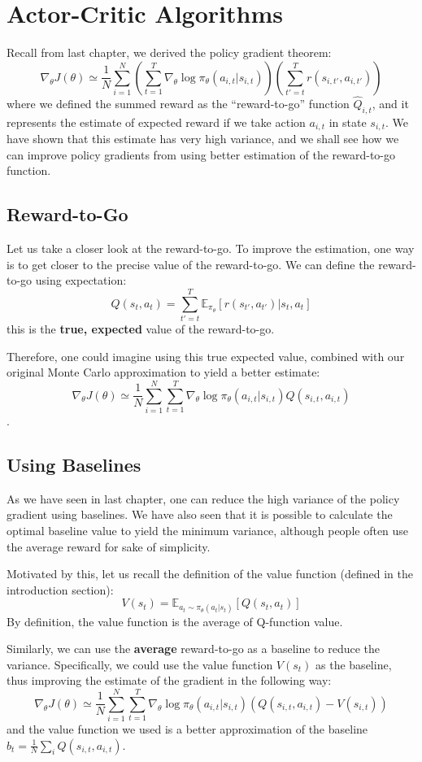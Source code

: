 \chapter{Actor-Critic Algorithms}
Recall from last chapter, we derived the policy gradient theorem:
$$\nabla_\theta J(\theta) \simeq \frac{1}{N}\sum_{i=1}^N\left(\sum_{t=1}^T\nabla_\theta \log\pi_\theta(a_{i,t}|s_{i,t})\right)\left(\sum_{t'=t}^T r(s_{i,t'},a_{i,t'})\right)$$
where we defined the summed reward as the ``reward-to-go'' function $\hat{Q}_{i,t}$, and it represents the estimate of expected reward if we take action $a_{i,t}$ in state $s_{i,t}$. We have shown that this estimate has very high variance, and we shall see how we can improve policy gradients from using better estimation of the reward-to-go function.

\section{Reward-to-Go}
Let us take a closer look at the reward-to-go. To improve the estimation, one way is to get closer to the precise value of the reward-to-go. We can define the reward-to-go using expectation:
$$Q(s_t,a_t) = \sum_{t'=t}^T \mathbb{E}_{\pi_\theta}\left[r(s_{t'},a_{t'})|s_t,a_t\right]$$
this is the \textbf{true, expected} value of the reward-to-go.

Therefore, one could imagine using this true expected value, combined with our original Monte Carlo approximation to yield a better estimate:
$$\nabla_\theta J(\theta) \simeq \frac{1}{N}\sum_{i=1}^N\sum_{t=1}^T\nabla_{\theta}\log \pi_\theta (a_{i,t}|s_{i,t})Q(s_{i,t},a_{i,t})$$.

\section{Using Baselines}
As we have seen in last chapter, one can reduce the high variance of the policy gradient using baselines. We have also seen that it is possible to calculate the optimal baseline value to yield the minimum variance, although people often use the average reward for sake of simplicity.

Motivated by this, let us recall the definition of the value function (defined in the introduction section):
$$V(s_t) = \mathbb{E}_{a_t\sim \pi_\theta(a_t|s_t)}\left[Q(s_t,a_t)\right]$$
By definition, the value function is the average of Q-function value.

Similarly, we can use the \textbf{average} reward-to-go as a baseline to reduce the variance. Specifically, we could use the value function $V(s_t)$ as the baseline, thus improving the estimate of the gradient in the following way:
$$\nabla_\theta J(\theta) \simeq \frac{1}{N}\sum_{i=1}^N\sum_{t=1}^T\nabla_{\theta}\log \pi_\theta (a_{i,t}|s_{i,t})\left(Q(s_{i,t},a_{i,t}) - V(s_{i,t})\right)$$
and the value function we used is a better approximation of the baseline $b_t = \frac{1}{N}\sum_i Q(s_{i,t},a_{i,t})$.

